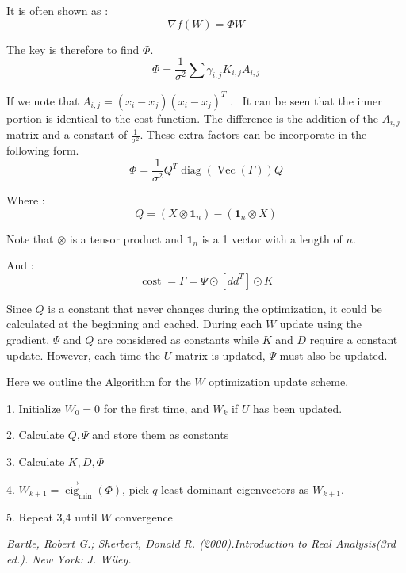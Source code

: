 \documentclass{article}
\newcommand{\nocomma}{}
\newcommand{\tmmathbf}[1]{\ensuremath{\boldsymbol{#1}}}
\newcommand{\tmop}[1]{\ensuremath{\operatorname{#1}}}
\newcommand{\tmtextit}[1]{{\itshape{#1}}}
\begin{document}
It is often shown as :
\[ \nabla f ( W) = \Phi W \]


The key is therefore to find $\Phi$.
\[ \Phi = \frac{1}{\sigma^2} \sum \gamma_{i, j} K_{i, j} A_{i, j}  \]


If we note that $A_{i, j} = ( x_i - x_j) ( x_i - x_j)^T$ . \ It can be seen
that the inner portion is identical to the cost function. The difference is
the addition of the $A_{i, j}$ matrix and a constant of $\frac{1}{\sigma^2}$.
These extra factors can be incorporate in the following form.
\[ \Phi = \frac{1}{\sigma^2} Q^T \tmop{diag} ( \tmop{Vec} ( \Gamma)) Q \]


Where :
\[ Q = ( X \otimes \tmmathbf{1}_n) - ( \tmmathbf{1}_n \otimes X) \]


Note that $\otimes$ is a tensor product and $\tmmathbf{1}_n$ is a 1 vector
with a length of $n$.



And :
\[ \tmop{cost} = \Gamma = \Psi \odot [ d d^T] \odot K \]


Since $Q$ is a constant that never changes during the optimization, it could
be calculated at the beginning and cached. During each $W$ update using the
gradient, $\Psi$ and $Q$ are considered as constants while $K$ and $D$ require
a constant update. However, each time the $U$ matrix is updated, $\Psi$ must
also be updated.



Here we outline the Algorithm for the $W$ optimization update scheme.



1. Initialize $W_0 = 0$ for the first time, and $W_k$ if $U$ has been
updated.

2. Calculate $Q \nocomma, \Psi$ and store them as constants

3. Calculate $K, D, \Phi$

4. $W_{k + 1} = \overrightarrow{\tmop{eig}}_{\min} ( \Phi)$, pick $q$ least
dominant eigenvectors as $W_{k + 1}$.

5. Repeat 3,4 until $W$ convergence










\begin{itemize}
  [1] \tmtextit{Bartle, Robert G.; Sherbert, Donald R.
  (2000).\tmtextit{Introduction to Real Analysis}(3rd ed.). New York: J.
  Wiley.}
\end{itemize}
\end{document}
